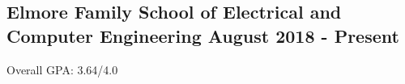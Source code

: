 
\subsection{{Elmore Family School of Electrical and Computer Engineering} \hfill August 2018 - Present}
\begin{zitemize}
\item Overall GPA: 3.64/4.0 
\end{zitemize}



